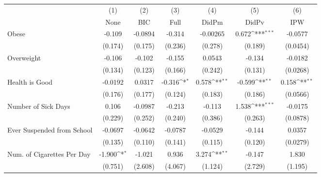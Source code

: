 {
\def\sym#1{\ifmmode^{#1}\else\(^{#1}\)\fi}
\begin{tabular}{l*{6}{c}}
\toprule
            &\multicolumn{1}{c}{(1)}&\multicolumn{1}{c}{(2)}&\multicolumn{1}{c}{(3)}&\multicolumn{1}{c}{(4)}&\multicolumn{1}{c}{(5)}&\multicolumn{1}{c}{(6)}\\
            &\multicolumn{1}{c}{None}&\multicolumn{1}{c}{BIC}&\multicolumn{1}{c}{Full}&\multicolumn{1}{c}{DidPm}&\multicolumn{1}{c}{DidPv}&\multicolumn{1}{c}{IPW}\\
\midrule
Obese       &      -0.109         &     -0.0894         &      -0.314         &    -0.00265         &       0.672\sym{***}&     -0.0577         \\
            &     (0.174)         &     (0.175)         &     (0.236)         &     (0.278)         &     (0.189)         &    (0.0454)         \\
\addlinespace
Overweight  &      -0.106         &      -0.102         &      -0.155         &      0.0543         &      -0.134         &     -0.0182         \\
            &     (0.134)         &     (0.123)         &     (0.166)         &     (0.242)         &     (0.131)         &    (0.0268)         \\
\addlinespace
Health is Good&     -0.0192         &      0.0317         &      -0.316\sym{*}  &       0.578\sym{**} &      -0.599\sym{**} &       0.158\sym{**} \\
            &     (0.176)         &     (0.177)         &     (0.124)         &     (0.183)         &     (0.186)         &    (0.0566)         \\
\addlinespace
Number of Sick Days&       0.106         &     -0.0987         &      -0.213         &      -0.113         &       1.538\sym{***}&     -0.0175         \\
            &     (0.229)         &     (0.252)         &     (0.240)         &     (0.386)         &     (0.263)         &    (0.0878)         \\
\addlinespace
Ever Suspended from School&     -0.0697         &     -0.0642         &     -0.0787         &     -0.0529         &      -0.144         &      0.0357         \\
            &     (0.135)         &     (0.110)         &     (0.141)         &     (0.115)         &     (0.120)         &    (0.0279)         \\
\addlinespace
Num. of Cigarettes Per Day&      -1.900\sym{*}  &      -1.021         &       0.936         &       3.274\sym{**} &      -0.147         &       1.830         \\
            &     (0.751)         &     (2.608)         &     (4.067)         &     (1.124)         &     (2.729)         &     (1.195)         \\
\bottomrule
\end{tabular}
}
